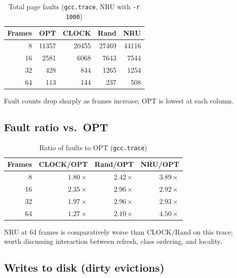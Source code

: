 \documentclass[11pt]{article}
\begin{document}
\begin{table}[h]
  \centering
  \caption{Total page faults (\texttt{gcc.trace}, NRU with \texttt{-r 1000})}
  \begin{tabular}{@{}r rrrr@{}}
    \toprule
    Frames & OPT & CLOCK & Rand & NRU \\
    \midrule
     8 & \num{11357} & \num{20455} & \num{27469} & \num{44116} \\
    16 &  \num{2581} &  \num{6068} &  \num{7643} &  \num{7544} \\
    32 &   \num{428} &   \num{844} &  \num{1265} &  \num{1254} \\
    64 &   \num{113} &   \num{144} &   \num{237} &   \num{508} \\
    \bottomrule
  \end{tabular}
\end{table}

Fault counts drop sharply as frames increase; OPT is lowest at each column.

\subsection{Fault ratio vs.\ OPT}

\begin{table}[h]
  \centering
  \caption{Ratio of faults to OPT (\texttt{gcc.trace})}
  \begin{tabular}{@{}r rrr@{}}
    \toprule
    Frames & CLOCK/OPT & Rand/OPT & NRU/OPT \\
    \midrule
     8 & $1.80\times$ & $2.42\times$ & $3.89\times$ \\
    16 & $2.35\times$ & $2.96\times$ & $2.92\times$ \\
    32 & $1.97\times$ & $2.96\times$ & $2.93\times$ \\
    64 & $1.27\times$ & $2.10\times$ & $4.50\times$ \\
    \bottomrule
  \end{tabular}
\end{table}

NRU at \num{64} frames is comparatively worse than CLOCK/Rand on this trace; worth discussing interaction between refresh, class ordering, and locality.

\subsection{Writes to disk (dirty evictions)}
\end{document}
